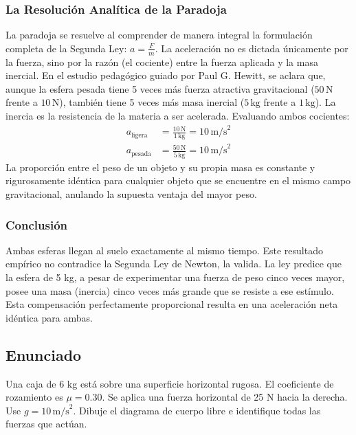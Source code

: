 \documentclass[12pt]{article}
\begin{document}
\subsubsection*{La Resolución Analítica de la Paradoja}
La paradoja se resuelve al comprender de manera integral la formulación completa de la Segunda Ley: $a = \frac{F}{m}$. La aceleración no es dictada únicamente por la fuerza, sino por la razón (el cociente) entre la fuerza aplicada y la masa inercial.
En el estudio pedagógico guiado por Paul G. Hewitt, se aclara que, aunque la esfera pesada tiene 5 veces más fuerza atractiva gravitacional ($50 \, \text{N}$ frente a $10 \, \text{N}$), también tiene 5 veces más masa inercial ($5 \, \text{kg}$ frente a $1 \, \text{kg}$). La inercia es la resistencia de la materia a ser acelerada. 
Evaluando ambos cocientes:
\begin{align*}
    a_{\text{ligera}} &= \frac{10 \, \text{N}}{1 \, \text{kg}} = 10 \, \text{m/s}^2 \\
    a_{\text{pesada}} &= \frac{50 \, \text{N}}{5 \, \text{kg}} = 10 \, \text{m/s}^2
\end{align*}
La proporción entre el peso de un objeto y su propia masa es constante y rigurosamente idéntica para cualquier objeto que se encuentre en el mismo campo gravitacional, anulando la supuesta ventaja del mayor peso.

\subsubsection*{Conclusión}
Ambas esferas llegan al suelo exactamente al mismo tiempo. Este resultado empírico no contradice la Segunda Ley de Newton, la valida. La ley predice que la esfera de 5 kg, a pesar de experimentar una fuerza de peso cinco veces mayor, posee una masa (inercia) cinco veces más grande que se resiste a ese estímulo. Esta compensación perfectamente proporcional resulta en una aceleración neta idéntica para ambas.

\newpage

\subsection*{Enunciado}
Una caja de 6 kg está sobre una superficie horizontal rugosa. El coeficiente de rozamiento es $\mu = 0.30$. Se aplica una fuerza horizontal de 25 N hacia la derecha. Use $g = 10 \, \text{m/s}^2$. Dibuje el diagrama de cuerpo libre e identifique todas las fuerzas que actúan.

\begin{center}
\end{center}
\end{document}
